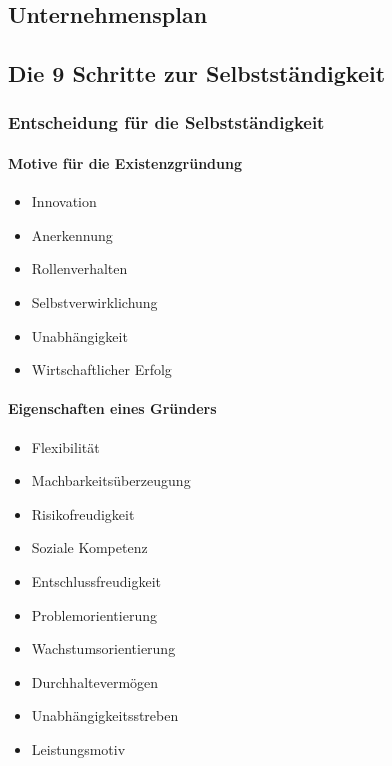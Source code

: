     \subsection{Unternehmensplan}
    \subsection{Die 9 Schritte zur Selbstständigkeit}
        \subsubsection{Entscheidung für die Selbstständigkeit}
            \paragraph*{Motive für die Existenzgründung}
            \begin{itemize}
                \item Innovation
                \item Anerkennung
                \item Rollenverhalten
                \item Selbstverwirklichung
                \item Unabhängigkeit
                \item Wirtschaftlicher Erfolg
            \end{itemize}

            
            \paragraph*{Eigenschaften eines Gründers}
            \begin{itemize}
                \item Flexibilität
                \item Machbarkeitsüberzeugung
                \item Risikofreudigkeit
                \item Soziale Kompetenz
                \item Entschlussfreudigkeit
                \item Problemorientierung
                \item Wachstumsorientierung
                \item Durchhaltevermögen
                \item Unabhängigkeitsstreben
                \item Leistungsmotiv
            \end{itemize}
